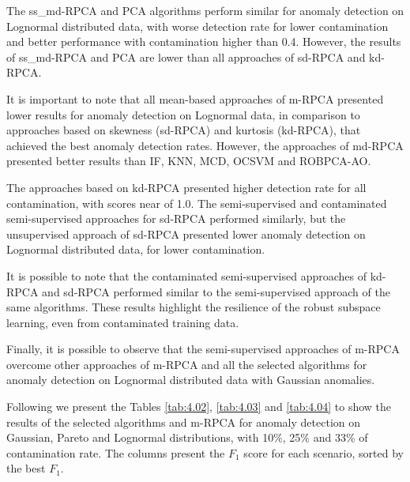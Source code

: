 \documentclass[review]{elsarticle}
\begin{document}
The ss\_md-RPCA and PCA algorithms perform similar for anomaly detection on Lognormal distributed data, with worse detection rate for lower contamination and better performance with contamination higher than 0.4. However, the results of ss\_md-RPCA and PCA are lower than all approaches of sd-RPCA and kd-RPCA. 

It is important to note that all mean-based approaches of m-RPCA presented lower results for anomaly detection on Lognormal data, in comparison to approaches based on skewness (sd-RPCA) and kurtosis (kd-RPCA), that achieved the best anomaly detection rates. However, the approaches of md-RPCA presented better results than IF, KNN, MCD, OCSVM and ROBPCA-AO.

The approaches based on kd-RPCA presented higher detection rate for all contamination, with scores near of 1.0. The semi-supervised and contaminated semi-supervised approaches for sd-RPCA performed similarly, but the unsupervised approach of sd-RPCA presented lower anomaly detection on Lognormal distributed data, for lower contamination.

It is possible to note that the contaminated semi-supervised approaches of kd-RPCA and sd-RPCA performed similar to the semi-supervised approach of the same algorithms. These results highlight the resilience of the robust subspace learning, even from contaminated training data.

Finally, it is possible to observe that the semi-supervised approaches of m-RPCA overcome other approaches of m-RPCA and all the selected algorithms for anomaly detection on Lognormal distributed data with Gaussian anomalies. 

Following we present the Tables \ref{tab:4.02}, \ref{tab:4.03} and \ref{tab:4.04} to show the results of the selected algorithms and m-RPCA for anomaly detection on Gaussian, Pareto and Lognormal distributions, with 10\%, 25\% and 33\% of contamination rate. The columns present the $F_1$ score for each scenario, sorted by the best $F_1$.
\end{document}
